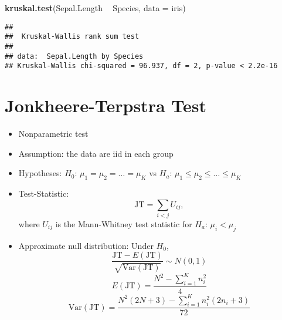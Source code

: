 \documentclass[
]{book}
\newenvironment{Shaded}{\begin{snugshade}}{\end{snugshade}}
\newcommand{\DataTypeTok}[1]{\textcolor[rgb]{0.13,0.29,0.53}{#1}}
\newcommand{\KeywordTok}[1]{\textcolor[rgb]{0.13,0.29,0.53}{\textbf{#1}}}
\newcommand{\NormalTok}[1]{#1}
\newcommand{\OperatorTok}[1]{\textcolor[rgb]{0.81,0.36,0.00}{\textbf{#1}}}
\newcommand{\StringTok}[1]{\textcolor[rgb]{0.31,0.60,0.02}{#1}}
\providecommand{\tightlist}{%
  \setlength{\itemsep}{0pt}\setlength{\parskip}{0pt}}
\begin{document}
\begin{Shaded}
\begin{Highlighting}[]
\KeywordTok{kruskal.test}\NormalTok{(Sepal.Length }\OperatorTok{~}\StringTok{ }\NormalTok{Species, }\DataTypeTok{data =}\NormalTok{ iris)}
\end{Highlighting}
\end{Shaded}

\begin{verbatim}
## 
##  Kruskal-Wallis rank sum test
## 
## data:  Sepal.Length by Species
## Kruskal-Wallis chi-squared = 96.937, df = 2, p-value < 2.2e-16
\end{verbatim}

\hypertarget{jonkheere-terpstra-test}{%
\section{Jonkheere-Terpstra Test}\label{jonkheere-terpstra-test}}

\begin{itemize}
\tightlist
\item
  Nonparametric test
\item
  Assumption: the data are iid in each group
\item
  Hypotheses: \(H_0\): \(\mu_1 = \mu_2 = \dots = \mu_K\) vs
  \(H_a\): \(\mu_1 \leq \mu_2 \leq \dots \leq \mu_K\)
\item
  Test-Statistic:
  \[\mathrm{JT} = \sum_{i < j} U_{ij},\]
  where \(U_{ij}\) is the Mann-Whitney test statistic
  for \(H_a\): \(\mu_i < \mu_j\)
\item
  Approximate null distribution: Under \(H_0\),
  \[\frac{\mathrm{JT} - E(\mathrm{JT})}{\sqrt{\mathrm{Var}(\mathrm{JT})}}
  \sim N(0,1)\]
  \[E(\mathrm{JT}) = \frac{N^2 - \sum_{i=1}^K n_i^2}{4}\]
  \[\mathrm{Var}(\mathrm{JT}) 
  = \frac{N^2(2N+3) - \sum_{i=1}^K n_i^2 (2n_i + 3)}{72}\]
\end{itemize}
\end{document}
